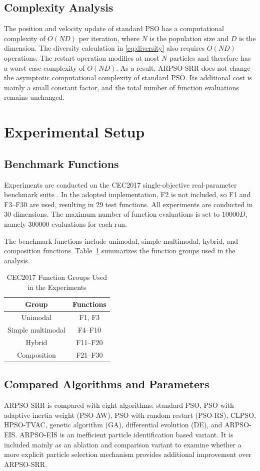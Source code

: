 \documentclass[conference]{IEEEtran}
\begin{document}
\subsection{Complexity Analysis}
The position and velocity update of standard PSO has a computational complexity of $O(ND)$ per iteration, where $N$ is the population size and $D$ is the dimension. The diversity calculation in \eqref{eq:diversity} also requires $O(ND)$ operations. The restart operation modifies at most $N$ particles and therefore has a worst-case complexity of $O(ND)$. As a result, ARPSO-SRR does not change the asymptotic computational complexity of standard PSO. Its additional cost is mainly a small constant factor, and the total number of function evaluations remains unchanged.

\section{Experimental Setup}\label{sec:experiment}

\subsection{Benchmark Functions}
Experiments are conducted on the CEC2017 single-objective real-parameter benchmark suite \cite{b5}. In the adopted implementation, F2 is not included, so F1 and F3--F30 are used, resulting in 29 test functions. All experiments are conducted in 30 dimensions. The maximum number of function evaluations is set to $10000D$, namely 300000 evaluations for each run.

The benchmark functions include unimodal, simple multimodal, hybrid, and composition functions. Table~\ref{tab:function_groups} summarizes the function groups used in the analysis.

\begin{table}[!t]
\caption{CEC2017 Function Groups Used in the Experiments}
\centering
\begin{tabular}{cc}
\toprule
Group & Functions \\
\midrule
Unimodal & F1, F3 \\
Simple multimodal & F4--F10 \\
Hybrid & F11--F20 \\
Composition & F21--F30 \\
\bottomrule
\end{tabular}
\label{tab:function_groups}
\end{table}

\subsection{Compared Algorithms and Parameters}
ARPSO-SRR is compared with eight algorithms: standard PSO, PSO with adaptive inertia weight (PSO-AW), PSO with random restart (PSO-RS), CLPSO, HPSO-TVAC, genetic algorithm (GA), differential evolution (DE), and ARPSO-EIS. ARPSO-EIS is an inefficient particle identification based variant. It is included mainly as an ablation and comparison variant to examine whether a more explicit particle selection mechanism provides additional improvement over ARPSO-SRR.
\end{document}
